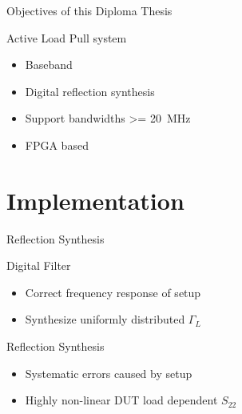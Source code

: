 \documentclass{beamer}
\begin{document}
\begin{frame}{Objectives of this Diploma Thesis}
    \begin{block}{Active Load Pull system}
        \begin{itemize}
            \item Baseband
            \item Digital reflection synthesis
            \item Support bandwidths \SI{>= 20}{\mega\hertz}
            \item FPGA based
        \end{itemize}
    \end{block}
\end{frame}


\section{Implementation}


\begin{frame}{Reflection Synthesis}
    \begin{block}{Digital Filter}
        \begin{itemize}
            \item Correct frequency response of setup
            \item Synthesize uniformly distributed $\Gamma_L$
        \end{itemize}
    \end{block}
    \begin{block}{Reflection Synthesis}
        \begin{itemize}
            \item Systematic errors caused by setup
            \item Highly non-linear DUT load dependent $S_{22}$
        \end{itemize}
    \end{block}
\end{frame}

\end{document}
